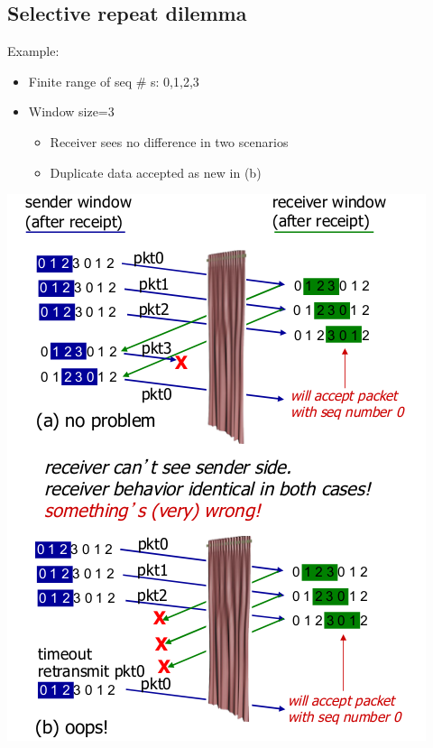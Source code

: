 \documentclass{article}[18pt]
\begin{document}
\subsection{Selective repeat dilemma}
Example:
\begin{itemize}
	\item Finite range of seq \# s: 0,1,2,3
	\item Window size=3
	\begin{itemize}
		\item Receiver sees no difference in two scenarios
		\item Duplicate data accepted as new in (b)
	\end{itemize}
\end{itemize}
\begin{center}
	\includegraphics[scale=0.7]{selective_repeat_dilemma}
\end{center}
\end{document}
